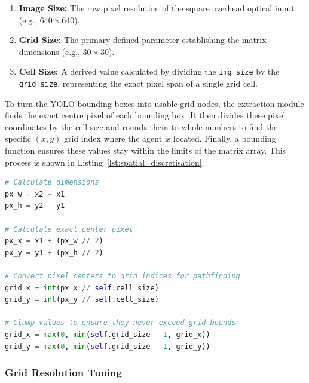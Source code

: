 \documentclass[12pt, a4paper]{article}
\begin{document}
\begin{enumerate}
    \item \textbf{Image Size:} The raw pixel resolution of the square overhead optical input (e.g., $640\times640$).

    \item \textbf{Grid Size:} The primary defined parameter establishing the matrix dimensions (e.g., $30\times30$).

    \item \textbf{Cell Size:} A derived value calculated by dividing the \texttt{img\_size} by the \texttt{grid\_size}, representing the exact pixel span of a single grid cell.
\end{enumerate}

\vspace{0.5cm}

\hspace{-1.5em}To turn the YOLO bounding boxes into usable grid nodes, the extraction module finds the exact centre pixel of each bounding box. It then divides these pixel coordinates by the cell size and rounds them to whole numbers to find the specific $(x, y)$ grid index where the agent is located. Finally, a bounding function ensures these values stay within the limits of the matrix array. This process is shown in Listing~\ref{lst:spatial_discretisation}.

\vspace{0.5cm}

\noindent\begin{minipage}{1\linewidth}
    \begin{lstlisting}[language=Python, caption=Translating visual bounding boxes into bounded discrete grid nodes, label=lst:spatial_discretisation]
# Calculate dimensions
px_w = x2 - x1
px_h = y2 - y1

# Calculate exact center pixel
px_x = x1 + (px_w // 2)
px_y = y1 + (px_h // 2)

# Convert pixel centers to grid indices for pathfinding
grid_x = int(px_x // self.cell_size)
grid_y = int(px_y // self.cell_size)

# Clamp values to ensure they never exceed grid bounds
grid_x = max(0, min(self.grid_size - 1, grid_x))
grid_y = max(0, min(self.grid_size - 1, grid_y))
    \end{lstlisting}
\end{minipage}

\vspace{0.5cm}

\subsubsection{Grid Resolution Tuning}
\end{document}
